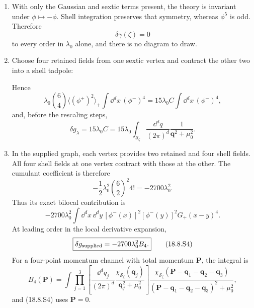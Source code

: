 \begin{enumerate}
\begin{enumerate}
\begin{enumerate}
      \item[(ii)]
      With only the Gaussian and sextic terms present, the theory is
      invariant under \(\phi\mapsto-\phi\).  Shell integration preserves
      that symmetry, whereas \(\phi^5\) is odd.  Therefore
      \[
        \boxed{\delta\gamma(\zeta)=0}
      \]
      to every order in \(\lambda_0\) alone, and there is no diagram to
      draw.

      \item[(iii)]
      Choose four retained fields from one sextic vertex and contract the
      other two into a shell tadpole:
      \begin{center}
      \end{center}
      Hence
      \[
        \lambda_0\binom64
          \langle(\phi^+)^2\rangle_+
          \int \dd^dx\,(\phi^-)^4
        =15\lambda_0C\int \dd^dx\,(\phi^-)^4,
      \]
      and, before the rescaling steps,
      \[
        \boxed{\delta g_{\lambda}=15\lambda_0C
          =15\lambda_0\int_{\mathcal S_\zeta}
            \frac{\dd^dq}{(2\pi)^d}\frac{1}{\mathbf q^2+\mu_0^2}.}
        \tag{18.8.S3}
      \]

      \item[(iv)]
      In the supplied graph, each vertex provides two retained and four
      shell fields.  All four shell fields at one vertex contract with
      those at the other.  The cumulant coefficient is therefore
      \[
        -\frac12\lambda_0^2
          \binom62^2 4!
        =-2700\lambda_0^2.
      \]
      Thus its exact bilocal contribution is
      \[
        -2700\lambda_0^2
        \int \dd^dx\,\dd^dy\,
          [\phi^-(x)]^2[\phi^-(y)]^2G_+(x-y)^4.
      \]
      At leading order in the local derivative expansion,
      \[
        \boxed{\delta g_{\rm supplied}
          =-2700\lambda_0^2B_4.}
        \tag{18.8.S4}
      \]
      For a four-point momentum channel with total momentum \(\mathbf P\),
      the integral is
      \[
        B_4(\mathbf P)=
        \int\prod_{j=1}^{3}\left[
          \frac{\dd^dq_j}{(2\pi)^d}
          \frac{\chi_{\mathcal S_\zeta}(\mathbf q_j)}
               {\mathbf q_j^2+\mu_0^2}\right]
        \frac{\chi_{\mathcal S_\zeta}
          (\mathbf P-\mathbf q_1-\mathbf q_2-\mathbf q_3)}
        {(\mathbf P-\mathbf q_1-\mathbf q_2-\mathbf q_3)^2+\mu_0^2},
      \]
      and (18.8.S4) uses \(\mathbf P=0\).


\end{enumerate}
\end{enumerate}
\end{enumerate}
